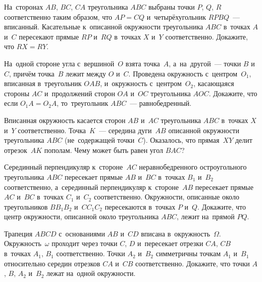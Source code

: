 


\begin{problems}

\item
На~сторонах $AB$, $BC$, $CA$ треугольника $ABC$ выбраны точки $P$, $Q$, $R$
соответственно таким образом, что $AP = CQ$ и~четырёхугольник $RPBQ$~---
вписанный.
Касательные к~описанной окружности треугольника $ABC$ в~точках $A$ и~$C$
пересекают прямые $RP$ и~$RQ$ в~точках $X$ и~$Y$ соответственно.
Докажите, что $RX = RY$.

\item
На~одной стороне угла с~вершиной~$O$ взята точка~$A$, а~на~другой~---
точки $B$ и~$C$, причём точка~$B$ лежит между $O$ и~$C$.
Проведена окружность с~центром~$O_{1}$, вписанная в~треугольник $OAB$,
и~окружность с~центром~$O_{2}$, касающаяся стороны $AC$ и~продолжений сторон
$OA$ и~$OC$ треугольника $AOC$.
Докажите, что если $O_{1}A = O_{2}A$, то~треугольник $ABC$~--- равнобедренный.

\item
Вписанная окружность касается сторон $AB$ и~$AC$ треугольника $ABC$
в~точках $X$ и~$Y$ соответственно.
Точка~$K$~--- середина дуги~$AB$ описанной окружности треугольника $ABC$
(не~содержащей точки~$C$).
Оказалось, что прямая~$XY$ делит отрезок~$AK$ пополам.
Чему может быть равен угол $BAC$?

\item
Серединный перпендикуляр к~стороне~$AC$ неравнобедренного остроугольного
треугольника $ABC$ пересекает прямые $AB$ и~$BC$ в~точках $B_{1}$ и~$B_{2}$
соответственно, а~серединный перпендикуляр к~стороне~$AB$ пересекает
прямые $AC$ и~$BC$ в~точках $C_{1}$ и~$C_{2}$ соответственно.
Окружности, описанные около треугольников $BB_{1}B_{2}$ и~$CC_{1}C_{2}$
пересекаются в~точках $P$ и~$Q$.
Докажите, что центр окружности, описанной около треугольника $ABC$, лежит
на~прямой $PQ$.

\item
Трапеция $ABCD$ с~основаниями $AB$ и~$CD$ вписана в~окружность~$\Omega$.
Окружность~$\omega$ проходит через точки $C$, $D$ и~пересекает отрезки $CA$,
$CB$ в~точках $A_{1}$, $B_{1}$ соответственно.
Точки $A_{2}$ и~$B_{2}$ симметричны точкам $A_{1}$ и~$B_{1}$ относительно
середин отрезков $CA$ и~$CB$ соответственно.
Докажите, что точки $A$, $B$, $A_{2}$ и~$B_{2}$ лежат на~одной окружности.


\end{problems}

